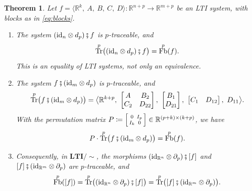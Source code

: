 \documentclass[11pt,a4paper]{article}
\theoremstyle{plain}
\newtheorem{theorem}{Theorem}
\theoremstyle{definition}
\theoremstyle{remark}
\DeclareMathOperator{\Fb}{Fb}
\DeclareMathOperator{\Tr}{Tr}
\newcommand{\R}{\mathbb{R}}
\newcommand{\id}{\mathrm{id}}
\newcommand{\then}{\mathbin{\fatsemi}}
\newcommand{\LTIq}{\mathbf{LTI}/{\sim}}
\newcommand{\sys}[5]{\bigl\langle #1,\ #2,\ #3,\ #4,\ #5 \bigr\rangle}
\begin{document}
\begin{theorem}
    \label{thm:main}
    Let $f = \sys{\R^k}{A}{B}{C}{D} \colon \R^{n+p} \to \R^{m+p}$ be an LTI system, with blocks as in \cref{eq:blocks}.
    \begin{enumerate}[label=\textup{(\alph*)}]
        \item The system $(\id_n \otimes d_p) \then f$ is $p$-traceable, and
              \begin{equation}
                  \label{eq:main-pre}
                  \Tr^p\bigl( (\id_n \otimes d_p) \then f \bigr) = \Fb^p(f) .
              \end{equation}
              This is an equality of LTI systems, not only an equivalence.
        \item The system $f \then (\id_m \otimes d_p)$ is $p$-traceable, and
              \begin{equation}
                  \label{eq:main-post-formula}
                  \Tr^p\bigl( f \then (\id_m \otimes d_p) \bigr) = \sys{\R^{k+p}}
                  {\begin{bmatrix} A & B_2 \\ C_2 & D_{22} \end{bmatrix}}
                  {\begin{bmatrix} B_1 \\ D_{21} \end{bmatrix}}
                  {\begin{bmatrix} C_1 & D_{12} \end{bmatrix}}
                  {D_{11}} .
              \end{equation}
              With the permutation matrix $P \coloneqq \begin{bsmallmatrix} 0 & I_p \\ I_k & 0 \end{bsmallmatrix} \in \R^{(p+k) \times (k+p)}$, we have
              \begin{equation}
                  \label{eq:main-post}
                  P \cdot \Tr^p\bigl( f \then (\id_m \otimes d_p) \bigr) = \Fb^p(f) .
              \end{equation}
        \item Consequently, in $\LTIq$, the morphisms $(\id_{\R^n} \otimes \partial_p) \then [f]$ and $[f] \then (\id_{\R^m} \otimes \partial_p)$ are $p$-traceable, and
              \begin{equation}
                  \label{eq:main-quotient}
                  \Fb^p([f])
                  = \Tr^p\bigl( (\id_{\R^n} \otimes \partial_p) \then [f] \bigr)
                  = \Tr^p\bigl( [f] \then (\id_{\R^m} \otimes \partial_p) \bigr) .
              \end{equation}
    \end{enumerate}
\end{theorem}
\end{document}

